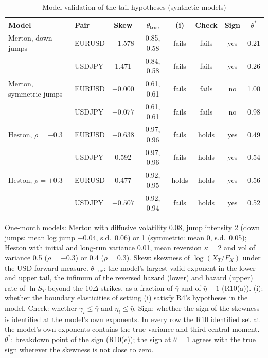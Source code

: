 \documentclass[11pt]{article}
\theoremstyle{result}
\newcommand{\D}{\Delta}
\begin{document}
\begin{table}[t]
\centering\footnotesize
\setlength{\tabcolsep}{3pt}
\caption{Model validation of the tail hypotheses (synthetic models)}\label{tab:models}
\begin{tabular}{llcccccc}
\toprule
Model & Pair & Skew & $\theta_{\mathrm{true}}$ & (i) & Check & Sign & $\theta^*$ \\
\midrule
Merton, down jumps & EURUSD & $-1.578$ & 0.85, 0.58 & fails & fails & yes & 0.21 \\
 & USDJPY & 1.471 & 0.84, 0.58 & fails & fails & yes & 0.26 \\
Merton, symmetric jumps & EURUSD & $-0.000$ & 0.61, 0.61 & fails & fails & no & 1.00 \\
 & USDJPY & $-0.077$ & 0.61, 0.61 & fails & fails & no & 0.98 \\
Heston, $\rho=-0.3$ & EURUSD & $-0.638$ & 0.97, 0.96 & fails & holds & yes & 0.49 \\
 & USDJPY & 0.592 & 0.97, 0.96 & fails & holds & yes & 0.54 \\
Heston, $\rho=+0.3$ & EURUSD & 0.477 & 0.92, 0.95 & holds & holds & yes & 0.56 \\
 & USDJPY & $-0.507$ & 0.92, 0.94 & fails & holds & yes & 0.52 \\
\bottomrule
\end{tabular}
\par\medskip
\begin{minipage}{0.97\linewidth}\footnotesize
One-month models: Merton with diffusive volatility 0.08, jump intensity 2 (down jumps: mean log jump $-0.04$, s.d.\ 0.06) or 1 (symmetric: mean 0, s.d.\ 0.05); Heston with initial and long-run variance 0.01, mean reversion $\kappa=2$ and vol of variance 0.5 ($\rho=-0.3$) or 0.4 ($\rho=0.3$). Skew: skewness of $\log(X_T/F_X)$ under the USD forward measure. $\theta_{\mathrm{true}}$: the model's largest valid exponent in the lower and upper tail, the infimum of the reversed hazard (lower) and hazard (upper) rate of $\ln S_T$ beyond the $10\D$ strikes, as a fraction of $\bar\gamma$ and of $\bar\eta-1$ (R10(a)). (i): whether the boundary elasticities of setting (i) satisfy R4's hypotheses in the model. Check: whether $\gamma_i\le\bar\gamma$ and $\eta_i\le\bar\eta$. Sign: whether the sign of the skewness is identified at the model's own exponents. In every row the R10 identified set at the model's own exponents contains the true variance and third central moment. $\theta^*$: breakdown point of the sign (R10(e)); the sign at $\theta=1$ agrees with the true sign wherever the skewness is not close to zero.
\end{minipage}
\end{table}
\end{document}
